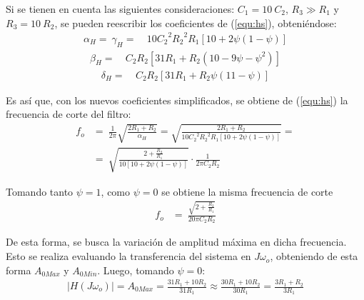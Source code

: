 \documentclass[a4paper]{article}
\begin{document}
Si se tienen en cuenta las siguientes consideraciones: $C_1 = 10 \ C_2$, $R_3 \gg R_1$ y $R_3 = 10 \ R_2$, se pueden reescribir los coeficientes de (\ref{equ:hs}), obteniéndose: 
\begin{equation*}
\begin{split}
	\alpha_H =\ \gamma_H =\ & 10 {C_{2}}^{2} {R_{2}}^{2} R_{1} \left[ 10 + 2 \psi \left(1 - \psi \right) \right]
\end{split}
\end{equation*}
\begin{equation*}
\begin{split}
	\beta_H =\ & C_{2} R_{2} \left[ 31 R_1 + R_2 \left(10 - 9 \psi - \psi^2 \right) \right]
\end{split}
\end{equation*}
\begin{equation*}
\begin{split}
 \delta_H =\ & C_{2} R_{2} \left[ 31 R_1 + R_2 \psi \left(11 - \psi \right) \right]
\end{split}
\end{equation*}

Es así que, con los nuevos coeficientes simplificados, se obtiene de (\ref{equ:hs}) la frecuencia de corte del filtro:
\begin{equation}
\begin{split}
	f_o &=\ \frac{1}{2 \pi} \sqrt{\frac{2R_1 + R_2}{\alpha_H}} = \sqrt{\frac{2R_1 + R_2}{10 {C_{2}}^{2} {R_{2}}^{2} R_{1} \left[ 10 + 2 \psi \left(1 - \psi \right) \right]}} = \\
	&=\ \sqrt{\frac{2 + \frac{R_2}{R_1}}{10 \left[ 10 + 2 \psi \left(1 - \psi \right) \right]}} \cdot \frac{1}{2 \pi C_2 R_2}
\end{split}
\label{equ:fogeneral}
\end{equation}

Tomando tanto $\psi = 1$, como $\psi = 0$ se obtiene la misma frecuencia de corte
\begin{equation*}
\begin{split}
	f_o &=\ \frac{\sqrt{2 + \frac{R_2}{R_1}}}{20 \pi C_2 R_2}
\end{split}
\end{equation*}

De esta forma, se busca la variación de amplitud máxima en dicha frecuencia. Esto se realiza evaluando la transferencia del sistema en $J\omega_o$, obteniendo de esta forma $A_{0Max}$ y $A_{0Min}$. Luego, tomando $\psi = 0$:
\begin{equation*}
\begin{split}
|H\left(J\omega_o\right)| = A_{0Max} = \frac{31 R_{1} + 10 R_{2}}{31 R_{1}} \approx \frac{30 R_{1} + 10 R_{2}}{30 R_{1}} = \frac{3 R_{1} + R_{2}}{3 R_{1}}
\end{split}
\end{equation*}
\end{document}
